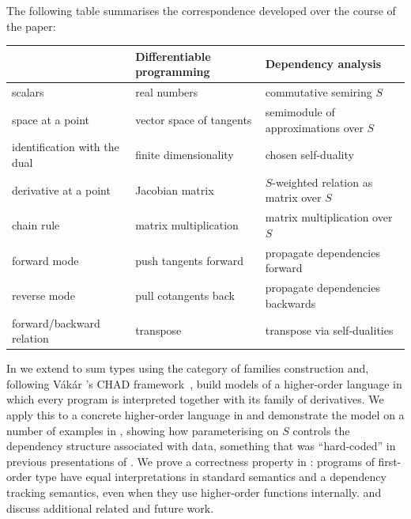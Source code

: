 The following table summarises the correspondence developed over the course of the paper:
\vspace{1.5mm}
\begin{center}
  \small
  \begin{tabular}{lll}
    \toprule
    & \textbf{Differentiable programming} & \textbf{Dependency analysis} \\
    \midrule
    scalars & real numbers & commutative semiring $S$ \\
    space at a point & vector space of tangents & semimodule of approximations over $S$ \\
    identification with the dual & finite dimensionality & chosen self-duality \\
    derivative at a point & Jacobian matrix & $S$-weighted relation as matrix over $S$ \\
    chain rule & matrix multiplication & matrix multiplication over $S$ \\
    forward mode & push tangents forward & propagate dependencies forward \\
    reverse mode & pull cotangents back & propagate dependencies backwards \\
    forward/backward relation & transpose & transpose via self-dualities \\
    \bottomrule
  \end{tabular}
\end{center}
\vspace{1.5mm}

In  we extend to sum types using the category of families construction and,
following V{\'a}k{\'a}r \etal{}'s CHAD framework~\cite{vakar22,nunes2023}, build models of a higher-order
language in which every program is interpreted together with its family of derivatives. We apply this to a
concrete higher-order language in  and demonstrate the model on a number of examples in , showing
how parameterising on $S$ controls the dependency structure associated with data, something that was
``hard-coded'' in previous presentations of \GPS. We prove a correctness property in
: programs of first-order type have equal interpretations in standard semantics and a dependency tracking semantics, even when they use higher-order functions internally.  and  discuss additional related and future work.

